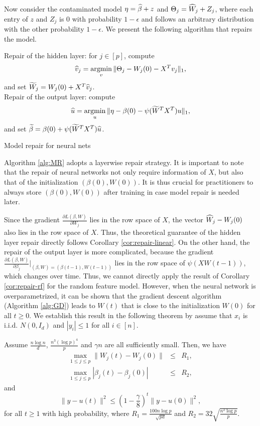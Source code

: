 Now consider the contaminated model $\eta=\widehat{\beta}+z$ and $\Theta_j=\widehat{W}_j+Z_j$, where each entry of $z$ and $Z_j$ is $0$ with probability $1-\epsilon$ and follows an arbitrary distribution with the other probability $1-\epsilon$. We present the following algorithm that repairs the model.

\begin{algorithm}[H]
\DontPrintSemicolon
{}
\nl Repair of the hidden layer: for $j\in[p]$, compute
$$\widehat{v}_j=\mathop{\rm argmin}_v\|\Theta_j-W_j(0)-X^Tv_j\|_1,$$
and set $\widetilde{W}_j=W_j(0)+X^T\widehat{v}_j$. \\
\nl Repair of the output layer: compute
$$\widehat{u}=\mathop{\rm argmin}_u\|\eta-\beta(0)-\psi(\widetilde{W}^TX^T)u\|_1,$$
and set $\widetilde{\beta}=\beta(0)+\psi(\widetilde{W}^TX^T)\widehat{u}$.
 \caption{Model repair for neural nets}\label{alg:MR}
\end{algorithm}
Algorithm \ref{alg:MR} adopts a layerwise repair strategy. It is important to note that the repair of neural networks not only require information of $X$, but also that of the initialization $(\beta(0),W(0))$. It is thus crucial for practitioners to always store $(\beta(0),W(0))$ after training in case model repair is needed later.

Since the gradient $\frac{\partial L(\beta,W)}{\partial W_j}$ lies in the row space of $X$, the vector $\widehat{W}_j-W_j(0)$ also lies in the row space of $X$. Thus, the theoretical guarantee of the hidden layer repair directly follows Corollary \ref{cor:repair-linear}. On the other hand, the repair of the output layer is more complicated, because the gradient $\frac{\partial L(\beta,W)}{\partial \beta_j}|_{(\beta,W)=(\beta(t-1),W(t-1))}$ lies in the row space of $\psi(XW(t-1))$, which changes over time. Thus, we cannot directly apply the result of Corollary \ref{cor:repair-rf} for the random feature model. However, when the neural network is overparametrized, it can be shown that the gradient descent algorithm (Algorithm \ref{alg:GD}) leads to $W(t)$ that is close to the initialization $W(0)$ for all $t\geq 0$. We establish this result in the following theorem by assume that $x_i$ is i.i.d. $N(0,I_d)$ and $|y_i|\leq 1$ for all $i\in[n]$.

\begin{thm}\label{thm:nn-grad-relu}
Assume $\frac{n\log n}{d}$, $\frac{n^3(\log p)^4}{p}$ and $\gamma n$ are all sufficiently small. Then, we have
\begin{eqnarray}
\label{eq:iter-parameter-relu} \max_{1\leq j\leq p}\|W_j(t)-W_j(0)\| &\leq& R_1, \\
\label{eq:iter-parameter-beta-relu} \max_{1\leq j\leq p}|\beta_j(t)-\beta_j(0)| &\leq& R_2,
\end{eqnarray}
and
\begin{equation}
\|y-u(t)\|^2 \leq \left(1-\frac{\gamma}{8}\right)^t\|y-u(0)\|^2, \label{eq:iter-function-relu}
\end{equation}
for all $t\geq 1$ with high probability, where $R_1=\frac{100n\log p}{\sqrt{pd}}$ and $R_2=32\sqrt{\frac{n^2\log p}{p}}$.
\end{thm}

